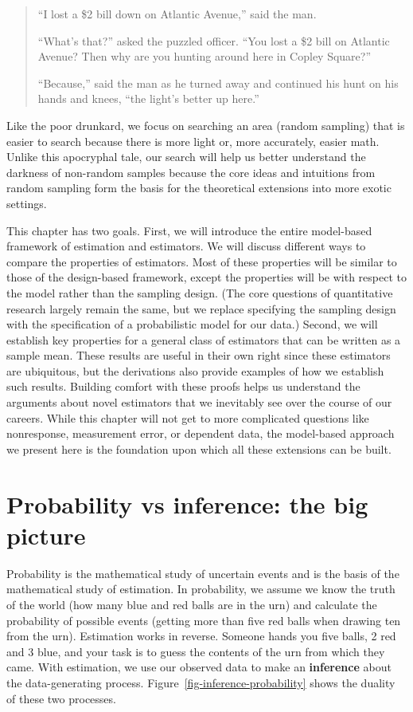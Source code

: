 \documentclass[
  13pt,
  letterpaper,
  DIV=11,
  numbers=noendperiod]{scrreprt}
\theoremstyle{plain}
\theoremstyle{plain}
\theoremstyle{definition}
\theoremstyle{definition}
\theoremstyle{remark}
\begin{document}
\begin{quote}
``I lost a \$2 bill down on Atlantic Avenue,'' said the man.

``What's that?'' asked the puzzled officer. ``You lost a \$2 bill on
Atlantic Avenue? Then why are you hunting around here in Copley
Square?''

``Because,'' said the man as he turned away and continued his hunt on
his hands and knees, ``the light's better up here.''
\end{quote}

Like the poor drunkard, we focus on searching an area (random sampling)
that is easier to search because there is more light or, more
accurately, easier math. Unlike this apocryphal tale, our search will
help us better understand the darkness of non-random samples because the
core ideas and intuitions from random sampling form the basis for the
theoretical extensions into more exotic settings.

This chapter has two goals. First, we will introduce the entire
model-based framework of estimation and estimators. We will discuss
different ways to compare the properties of estimators. Most of these
properties will be similar to those of the design-based framework,
except the properties will be with respect to the model rather than the
sampling design. (The core questions of quantitative research largely
remain the same, but we replace specifying the sampling design with the
specification of a probabilistic model for our data.) Second, we will
establish key properties for a general class of estimators that can be
written as a sample mean. These results are useful in their own right
since these estimators are ubiquitous, but the derivations also provide
examples of how we establish such results. Building comfort with these
proofs helps us understand the arguments about novel estimators that we
inevitably see over the course of our careers. While this chapter will
not get to more complicated questions like nonresponse, measurement
error, or dependent data, the model-based approach we present here is
the foundation upon which all these extensions can be built.

\section{Probability vs inference: the big
picture}\label{probability-vs-inference-the-big-picture}

Probability is the mathematical study of uncertain events and is the
basis of the mathematical study of estimation. In probability, we assume
we know the truth of the world (how many blue and red balls are in the
urn) and calculate the probability of possible events (getting more than
five red balls when drawing ten from the urn). Estimation works in
reverse. Someone hands you five balls, 2 red and 3 blue, and your task
is to guess the contents of the urn from which they came. With
estimation, we use our observed data to make an \textbf{inference} about
the data-generating process. Figure~\ref{fig-inference-probability}
shows the duality of these two processes.
\end{document}
